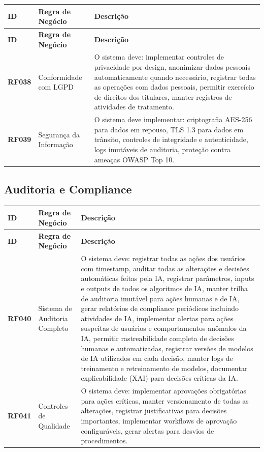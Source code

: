 \documentclass[12pt,a4paper]{article}
\newcommand{\rf}[1]{\textbf{\color{primaryblue}RF#1}}
\begin{document}
\begin{longtable}{|p{2cm}|p{5cm}|p{8cm}|}
\hline
\textbf{ID} & \textbf{Regra de Negócio} & \textbf{Descrição} \\
\hline
\endfirsthead
\hline
\textbf{ID} & \textbf{Regra de Negócio} & \textbf{Descrição} \\
\hline
\endhead

\rf{038} & Conformidade com LGPD & O sistema deve: implementar controles de privacidade por design, anonimizar dados pessoais automaticamente quando necessário, registrar todas as operações com dados pessoais, permitir exercício de direitos dos titulares, manter registros de atividades de tratamento. \\
\hline

\rf{039} & Segurança da Informação & O sistema deve implementar: criptografia AES-256 para dados em repouso, TLS 1.3 para dados em trânsito, controles de integridade e autenticidade, logs imutáveis de auditoria, proteção contra ameaças OWASP Top 10. \\
\hline

\end{longtable}

\subsection{Auditoria e Compliance}

\begin{longtable}{|p{2cm}|p{5cm}|p{8cm}|}
\hline
\textbf{ID} & \textbf{Regra de Negócio} & \textbf{Descrição} \\
\hline
\endfirsthead
\hline
\textbf{ID} & \textbf{Regra de Negócio} & \textbf{Descrição} \\
\hline
\endhead

\rf{040} & Sistema de Auditoria Completo & O sistema deve: registrar todas as ações dos usuários com timestamp, auditar todas as alterações e decisões automáticas feitas pela IA, registrar parâmetros, inputs e outputs de todos os algoritmos de IA, manter trilha de auditoria imutável para ações humanas e de IA, gerar relatórios de compliance periódicos incluindo atividades de IA, implementar alertas para ações suspeitas de usuários e comportamentos anômalos da IA, permitir rastreabilidade completa de decisões humanas e automatizadas, registrar versões de modelos de IA utilizados em cada decisão, manter logs de treinamento e retreinamento de modelos, documentar explicabilidade (XAI) para decisões críticas da IA. \\
\hline

\rf{041} & Controles de Qualidade & O sistema deve: implementar aprovações obrigatórias para ações críticas, manter versionamento de todas as alterações, registrar justificativas para decisões importantes, implementar workflows de aprovação configuráveis, gerar alertas para desvios de procedimentos. \\
\hline

\end{longtable}
\end{document}
